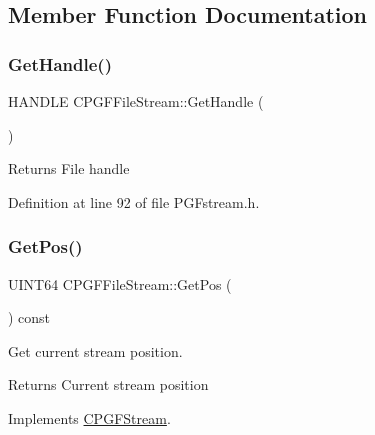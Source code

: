 \subsection{Member Function Documentation}
\mbox{\label{classCPGFFileStream_a94046c82916ffeb6aa868f27f25b1c37}} 
\subsubsection{\texorpdfstring{GetHandle()}{GetHandle()}}
{\footnotesize\ttfamily H\+A\+N\+D\+LE C\+P\+G\+F\+File\+Stream\+::\+Get\+Handle (\begin{DoxyParamCaption}{ }\end{DoxyParamCaption})\hspace{0.3cm}{\ttfamily [inline]}}

\begin{DoxyReturn}{Returns}
File handle 
\end{DoxyReturn}


Definition at line 92 of file P\+G\+Fstream.\+h.


\begin{DoxyCode}{0}

\end{DoxyCode}
\mbox{\label{classCPGFFileStream_a9ec4715342add84461c62631101e1ce6}} 
\subsubsection{\texorpdfstring{GetPos()}{GetPos()}}
{\footnotesize\ttfamily U\+I\+N\+T64 C\+P\+G\+F\+File\+Stream\+::\+Get\+Pos (\begin{DoxyParamCaption}{ }\end{DoxyParamCaption}) const\hspace{0.3cm}{\ttfamily [virtual]}}

Get current stream position. \begin{DoxyReturn}{Returns}
Current stream position 
\end{DoxyReturn}


Implements \mbox{\hyperlink{classCPGFStream_a841e109647ea77dd9e589ab00ef4aad8}{C\+P\+G\+F\+Stream}}.



